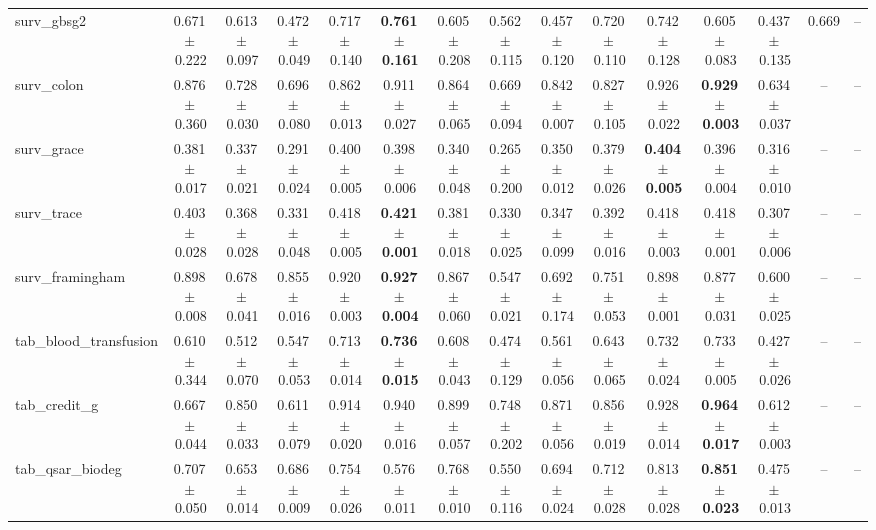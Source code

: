 \documentclass[8pt]{extarticle}
\begin{document}
\begin{longtable}{l*{14}{c}}
surv\_gbsg2 & 0.671\,$\pm$\,0.222 & 0.613\,$\pm$\,0.097 & 0.472\,$\pm$\,0.049 & 0.717\,$\pm$\,0.140 & \textbf{0.761\,$\pm$\,0.161} & 0.605\,$\pm$\,0.208 & 0.562\,$\pm$\,0.115 & 0.457\,$\pm$\,0.120 & 0.720\,$\pm$\,0.110 & 0.742\,$\pm$\,0.128 & 0.605\,$\pm$\,0.083 & 0.437\,$\pm$\,0.135 & 0.669 & -- \\
surv\_colon & 0.876\,$\pm$\,0.360 & 0.728\,$\pm$\,0.030 & 0.696\,$\pm$\,0.080 & 0.862\,$\pm$\,0.013 & 0.911\,$\pm$\,0.027 & 0.864\,$\pm$\,0.065 & 0.669\,$\pm$\,0.094 & 0.842\,$\pm$\,0.007 & 0.827\,$\pm$\,0.105 & 0.926\,$\pm$\,0.022 & \textbf{0.929\,$\pm$\,0.003} & 0.634\,$\pm$\,0.037 & -- & -- \\
surv\_grace & 0.381\,$\pm$\,0.017 & 0.337\,$\pm$\,0.021 & 0.291\,$\pm$\,0.024 & 0.400\,$\pm$\,0.005 & 0.398\,$\pm$\,0.006 & 0.340\,$\pm$\,0.048 & 0.265\,$\pm$\,0.200 & 0.350\,$\pm$\,0.012 & 0.379\,$\pm$\,0.026 & \textbf{0.404\,$\pm$\,0.005} & 0.396\,$\pm$\,0.004 & 0.316\,$\pm$\,0.010 & -- & -- \\
surv\_trace & 0.403\,$\pm$\,0.028 & 0.368\,$\pm$\,0.028 & 0.331\,$\pm$\,0.048 & 0.418\,$\pm$\,0.005 & \textbf{0.421\,$\pm$\,0.001} & 0.381\,$\pm$\,0.018 & 0.330\,$\pm$\,0.025 & 0.347\,$\pm$\,0.099 & 0.392\,$\pm$\,0.016 & 0.418\,$\pm$\,0.003 & 0.418\,$\pm$\,0.001 & 0.307\,$\pm$\,0.006 & -- & -- \\
surv\_framingham & 0.898\,$\pm$\,0.008 & 0.678\,$\pm$\,0.041 & 0.855\,$\pm$\,0.016 & 0.920\,$\pm$\,0.003 & \textbf{0.927\,$\pm$\,0.004} & 0.867\,$\pm$\,0.060 & 0.547\,$\pm$\,0.021 & 0.692\,$\pm$\,0.174 & 0.751\,$\pm$\,0.053 & 0.898\,$\pm$\,0.001 & 0.877\,$\pm$\,0.031 & 0.600\,$\pm$\,0.025 & -- & -- \\
tab\_blood\_transfusion & 0.610\,$\pm$\,0.344 & 0.512\,$\pm$\,0.070 & 0.547\,$\pm$\,0.053 & 0.713\,$\pm$\,0.014 & \textbf{0.736\,$\pm$\,0.015} & 0.608\,$\pm$\,0.043 & 0.474\,$\pm$\,0.129 & 0.561\,$\pm$\,0.056 & 0.643\,$\pm$\,0.065 & 0.732\,$\pm$\,0.024 & 0.733\,$\pm$\,0.005 & 0.427\,$\pm$\,0.026 & -- & -- \\
tab\_credit\_g & 0.667\,$\pm$\,0.044 & 0.850\,$\pm$\,0.033 & 0.611\,$\pm$\,0.079 & 0.914\,$\pm$\,0.020 & 0.940\,$\pm$\,0.016 & 0.899\,$\pm$\,0.057 & 0.748\,$\pm$\,0.202 & 0.871\,$\pm$\,0.056 & 0.856\,$\pm$\,0.019 & 0.928\,$\pm$\,0.014 & \textbf{0.964\,$\pm$\,0.017} & 0.612\,$\pm$\,0.003 & -- & -- \\
tab\_qsar\_biodeg & 0.707\,$\pm$\,0.050 & 0.653\,$\pm$\,0.014 & 0.686\,$\pm$\,0.009 & 0.754\,$\pm$\,0.026 & 0.576\,$\pm$\,0.011 & 0.768\,$\pm$\,0.010 & 0.550\,$\pm$\,0.116 & 0.694\,$\pm$\,0.024 & 0.712\,$\pm$\,0.028 & 0.813\,$\pm$\,0.028 & \textbf{0.851\,$\pm$\,0.023} & 0.475\,$\pm$\,0.013 & -- & -- \\

\end{longtable}
\end{document}
